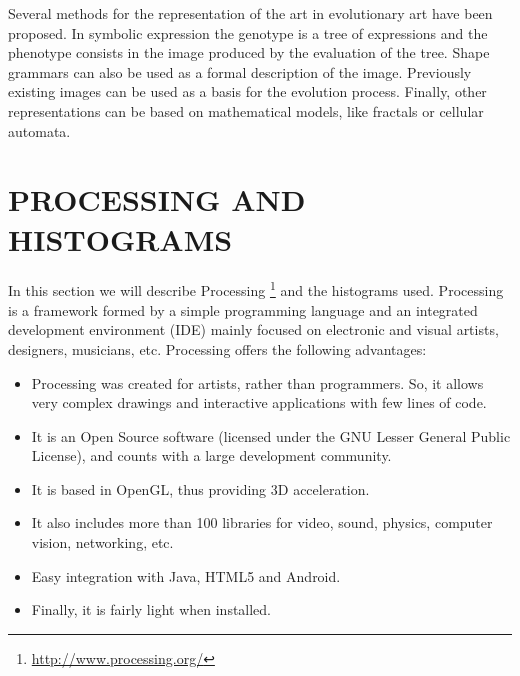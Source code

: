 \documentclass[a4paper,twoside]{article}
\begin{document}
Several methods for the representation of the art in evolutionary art have been proposed. In symbolic expression the genotype is a tree of expressions and the phenotype consists in the image produced  by the evaluation of the tree. Shape grammars can also be used as a formal description of the image. Previously existing images can be used as a basis for the evolution process. Finally, other representations can be based on mathematical models, like fractals or cellular automata.




\section{PROCESSING AND HISTOGRAMS}
\label{sec:processing}
\noindent In this section we will describe Processing \footnote{\url{http://www.processing.org/}} and the histograms used. Processing \cite{PROCESSING} is a framework formed by a simple programming language and an integrated development environment (IDE) mainly focused on electronic and visual artists, designers, musicians, etc. Processing offers the following advantages:

\begin{itemize}
\item Processing was created for artists, rather than programmers. So, it allows very complex drawings and interactive applications with few lines of code.
\item It is an Open Source software (licensed under the GNU Lesser General Public License), and counts with a large development community.
\item It is based in OpenGL, thus providing 3D acceleration.
\item It also includes more than 100 libraries for video, sound, physics, computer vision, networking, etc.
\item Easy integration with Java, HTML5 and Android.
\item Finally, it is fairly light when installed.
\end{itemize}



\end{document}
